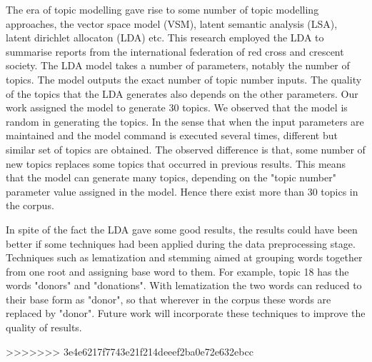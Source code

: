 \begin{flushleft}
  The era of topic modelling gave rise to some number of topic modelling approaches, the vector space model (VSM), latent semantic analysis (LSA), latent dirichlet allocaton (LDA) etc. This research employed the LDA to summarise reports from the international federation of red cross and crescent society.
  The LDA model takes a number of parameters, notably the number of topics. The model outputs the exact number of topic number inputs.
  The quality of the topics that the LDA generates also depends on the other parameters. Our work assigned the model to generate 30 topics. We observed that the model is random in generating the topics.
  In the sense that when the input parameters are maintained and the model command is executed several times, different but similar set of topics are obtained. The observed difference is that, some number of new topics replaces some topics that occurred in previous results. This means that the model can generate  many topics, depending on the "topic number" parameter value assigned in the model. Hence there exist more than 30 topics in the corpus.
\end{flushleft}
\begin{flushleft}
  In spite of the fact the LDA gave some good results, the results could have been better if some techniques had been applied during the data preprocessing stage. Techniques such as lematization and stemming aimed
  at grouping words
  together from one root and assigning base word to them. For example, topic 18 has the words "donors" and "donations". With lematization
  the two words can reduced to their base form as "donor", so that wherever
  in the corpus these words are replaced by "donor".  
  Future work will incorporate these techniques to improve the quality of results.
\end{flushleft}
>>>>>>> 3e4e6217f7743e21f214deeef2ba0e72e632ebcc
